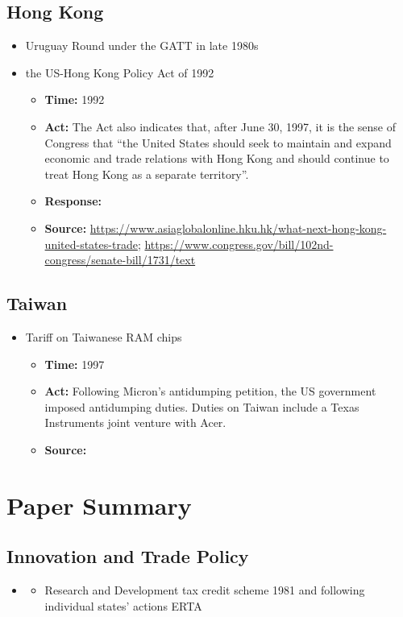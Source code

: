 	\subsection{Hong Kong}
		\begin{itemize}
		\item	Uruguay Round under the GATT in late 1980s
		\item the US-Hong Kong Policy Act of 1992
				\begin{itemize}
				\item \textbf{Time: }1992
				\item \textbf{Act: }The Act also indicates that, after June 30, 1997, it is the sense of Congress that “the United States should seek to maintain and expand economic and trade relations with Hong Kong and should continue to treat Hong Kong as a separate territory”. 
				\item \textbf{Response: }
				\item	\textbf{Source: }\url{https://www.asiaglobalonline.hku.hk/what-next-hong-kong-united-states-trade}; \url{https://www.congress.gov/bill/102nd-congress/senate-bill/1731/text}
				\end{itemize}
		\end{itemize}
		
	\subsection{Taiwan}
		\begin{itemize}
		\item	Tariff on Taiwanese RAM chips
			\begin{itemize}
			\item \textbf{Time: } 1997
			\item \textbf{Act: } Following Micron's antidumping petition, the US government imposed antidumping duties. Duties on Taiwan include a Texas Instruments joint venture with Acer.
			\item	\textbf{Source: }\cite{Bown2020}
			\end{itemize}
		\end{itemize}
		
		
\section{Paper Summary}
	\subsection{Innovation and Trade Policy}
	\begin{itemize}
		\item \cite{AkcigitAtesImpullitti2018} 
			\begin{itemize}
			\item Research and Development tax credit scheme 1981 and following individual states' actions ERTA
			\end{itemize}
	\end{itemize}
	
